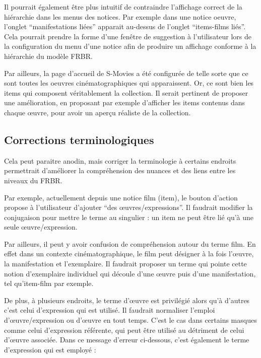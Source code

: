 Il pourrait également être plus intuitif de contraindre l’affichage correct de la hiérarchie dans les menus des notices. Par exemple dans une notice \gls{oeuvre}, l’onglet “\gls{manifestation}s liées” apparait au-dessus de l’onglet “\gls{item}s-films liés”. Cela pourrait prendre la forme d’une fenêtre de suggestion à l’utilisateur lors de la configuration du menu d’une notice afin de produire un affichage conforme à la hiérarchie du modèle \gls{FRBR}.  

Par ailleurs, la page d’accueil de S-Movies a été configurée de telle sorte que ce sont toutes les \gls{oeuvre}s cinématographiques qui apparaissent. Or, ce sont bien les \gls{item}s qui composent véritablement la collection. Il serait pertinent de proposer une amélioration, en proposant par exemple d’afficher les \gls{item}s contenus dans chaque œuvre, pour avoir un aperçu réaliste de la collection.  

\subsection{Corrections terminologiques }

Cela peut paraitre anodin, mais corriger la terminologie à certains endroits permettrait d’améliorer la compréhension des nuances et des liens entre les niveaux du FRBR.  

Par exemple, actuellement depuis une notice film (\gls{item}), le bouton d’action propose à l’utilisateur d’ajouter “des œuvres/expressions”. Il faudrait modifier la conjugaison pour mettre le terme au singulier : un \gls{item} ne peut être lié qu’à une seule œuvre/expression.  

Par ailleurs, il peut y avoir confusion de compréhension autour du terme film. En effet dans un contexte cinématographique, le film peut désigner à la fois l’œuvre, la \gls{manifestation} et l’exemplaire. Il faudrait proposer un terme qui pointe cette notion d’exemplaire individuel qui découle d’une œuvre puis d’une \gls{manifestation}, tel qu'\gls{item}-film par exemple.  

De plus, à plusieurs endroits, le terme d’œuvre est privilégié alors qu’à d’autres c’est celui d’expression qui est utilisé. Il faudrait normaliser l’emploi d’œuvre/expression ou d’œuvre en tout temps. C’est le cas dans certains masques comme celui d’expression référente, qui peut être utilisé au détriment de celui d’œuvre associée. Dans ce message d’erreur ci-dessous, c’est également le terme d’expression qui est employé :  

